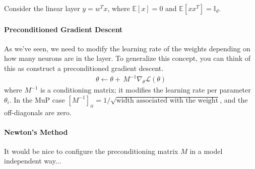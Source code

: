 Consider the linear layer $y = w^T x$, where $\mathbb E[x] = 0$ and $\mathbb E[xx^T]= \mathbb I_d$. 


\paragraph{Preconditioned Gradient Descent}
As we've seen, we need to modify the learning rate of the weights depending on how many neurons are in the layer. To generalize this concept, you can think of this as construct a preconditioned gradient descent.
\begin{align}
	\theta \leftarrow \theta + \, M^{-1} \nabla_\theta \mathcal L(\theta)
\end{align} 
where $M^{-1}$ is a conditioning matrix; it modifies the learning rate per parameter $\theta_i$. In the MuP case $[M^{-1}]_{ii} = 1/\sqrt{\text{width associated with the weight}}$, and the off-diagonals are zero.

\paragraph{Newton's Method} It would be nice to configure the preconditioning matrix $M$ in a model independent way...

